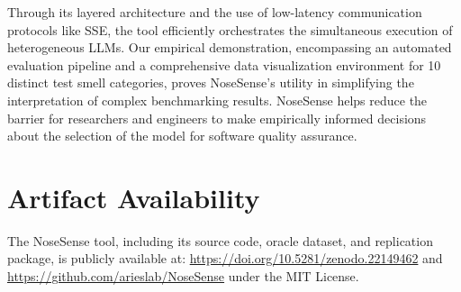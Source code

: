 \documentclass[sigconf]{acmart}
\begin{document}
Through its layered architecture and the use of low-latency communication protocols like SSE, the tool efficiently orchestrates the simultaneous execution of heterogeneous LLMs. Our empirical demonstration, encompassing an automated evaluation pipeline and a comprehensive data visualization environment for 10 distinct test smell categories, proves NoseSense's utility in simplifying the interpretation of complex benchmarking results. NoseSense helps reduce the barrier for researchers and engineers to make empirically informed decisions about the selection of the model for software quality assurance.

\section*{Artifact Availability}

The NoseSense tool, including its source code, oracle dataset, and replication package, is publicly available at: \url{https://doi.org/10.5281/zenodo.22149462} and \url{https://github.com/arieslab/NoseSense} under the MIT License.




\end{document}

